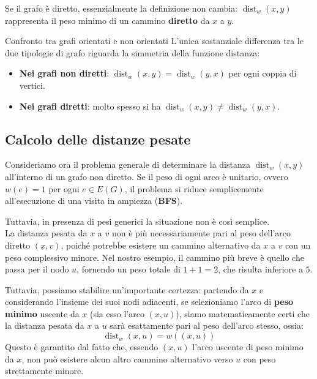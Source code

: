 \documentclass[12pt]{report}
\begin{document}
	Se il grafo è diretto, essenzialmente la definizione non cambia: $\operatorname{dist}_w(x,y)$ rappresenta il peso minimo di un cammino \textbf{diretto} da $x$ a $y$.
	
	\begin{osservazione}{Confronto tra grafi orientati e non orientati}{}
		L'unica sostanziale differenza tra le due tipologie di grafo riguarda la simmetria della funzione distanza:
		\begin{itemize}
			\item \textbf{Nei grafi non diretti}: $\operatorname{dist}_w(x, y) = \operatorname{dist}_w(y, x)$ per ogni coppia di vertici.
			\item \textbf{Nei grafi diretti}: molto spesso si ha $\operatorname{dist}_w(x, y) \neq \operatorname{dist}_w(y, x)$.
		\end{itemize}
	\end{osservazione}
	
	\subsection{Calcolo delle distanze pesate}
	
	Consideriamo ora il problema generale di determinare la distanza $\operatorname{dist}_w(x, y)$ all'interno di un grafo non diretto. 
	Se il peso di ogni arco è unitario, ovvero $w(e) = 1$ per ogni $e \in E(G)$, il problema si riduce semplicemente all'esecuzione di una visita in ampiezza (\textbf{BFS}).
	
	Tuttavia, in presenza di pesi generici la situazione non è così semplice.\\
	La distanza pesata da $x$ a $v$ non è più necessariamente pari al peso dell'arco diretto $(x, v)$, poiché potrebbe esistere un cammino alternativo da $x$ a $v$ con un peso complessivo minore. Nel nostro esempio, il cammino più breve è quello che passa per il nodo $u$, fornendo un peso totale di $1 + 1 = 2$, che risulta inferiore a $5$.
	
	Tuttavia, possiamo stabilire un'importante certezza: partendo da $x$ e considerando l'insieme dei suoi nodi adiacenti, se selezioniamo l'arco di \textbf{peso minimo} uscente da $x$ (sia esso l'arco $(x, u)$), siamo matematicamente certi che la distanza pesata da $x$ a $u$ sarà esattamente pari al peso dell'arco stesso, ossia:
	\[
	\operatorname{dist}_w(x, u) = w((x, u))
	\]
	Questo è garantito dal fatto che, essendo $(x, u)$ l'arco uscente di peso minimo da $x$, non può esistere alcun altro cammino alternativo verso $u$ con peso strettamente minore.
	
\end{document}
